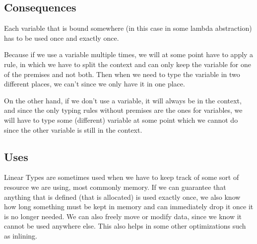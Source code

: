 \documentclass{article}
\begin{document}
\subsection{Consequences}
Each variable that is bound somewhere (in this case in some lambda abstraction) has to be used once and exactly once.

Because if we use a variable multiple times, we will at some point have to apply a rule, in which we have to split the context and can only keep the variable for one of the premises and not both. Then when we need to type the variable in two different places, we can't since we only have it in one place.

On the other hand, if we don't use a variable, it will always be in the context, and since the only typing rules without premises are the ones for variables, we will have to type some (different) variable at some point which we cannot do since the other variable is still in the context.

\subsection{Uses}

Linear Types are sometimes used when we have to keep track of some sort of resource we are using, most commonly memory.
If we can guarantee that anything that is defined (that is allocated) is used exactly once, we also know how long something must be kept in memory and can immediately drop it once it is no longer needed. 
We can also freely move or modify data, since we know it cannot be used anywhere else. 
This also helps in some other optimizations such as inlining.
\end{document}
